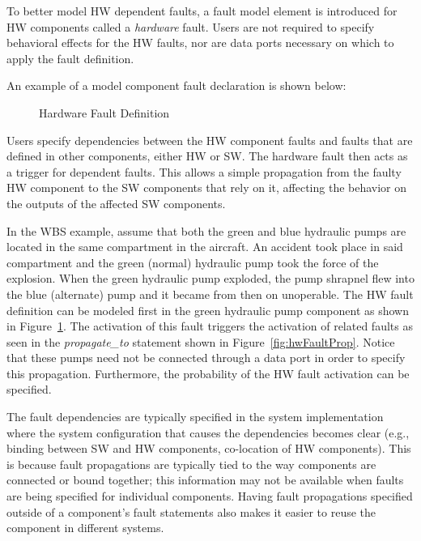 To better model HW dependent faults, a fault model element is introduced for HW components called a \textit{hardware} fault. Users are not required to specify behavioral effects for the HW faults, nor are data ports necessary on which to apply the fault definition. 

An example of a model component fault declaration is shown below:
\begin{figure}[h!]
	\vspace{-0.2in}
	\begin{center}
	\end{center}
	\vspace{-0.3in}
	\caption{Hardware Fault Definition}
	\label{fig:hwFault}
	\vspace{-0.2in}
\end{figure}

Users specify dependencies between the HW component faults and faults that are defined in other components, either HW or SW. The hardware fault then acts as a trigger for dependent faults. This allows a simple propagation from the faulty HW component to the SW components that rely on it, affecting the behavior on the outputs of the affected SW components.

In the WBS example, assume that both the green and blue hydraulic pumps are located in the same compartment in the aircraft. An accident took place in said compartment and the green (normal) hydraulic pump took the force of the explosion. When the green hydraulic pump exploded, the pump shrapnel flew into the blue (alternate) pump and it became from then on unoperable. The HW fault definition can be modeled first in the green hydraulic pump component as shown in Figure~\ref{fig:hwFault}. The activation of this fault triggers the activation of related faults as seen in the \textit{propagate\_to} statement shown in Figure~\ref{fig:hwFaultProp}. Notice that these pumps need not be connected through a data port in order to specify this propagation. Furthermore, the probability of the HW fault activation can be specified. 

The fault dependencies are typically specified in the system implementation where the system configuration that causes the dependencies becomes clear (e.g., binding between SW and HW components, co-location of HW components). This is because fault propagations are typically tied to the way components are connected or bound together; this information may not be available when faults are being specified for individual components. Having fault propagations specified outside of a component’s fault statements also makes it easier to reuse the component in different systems. 

